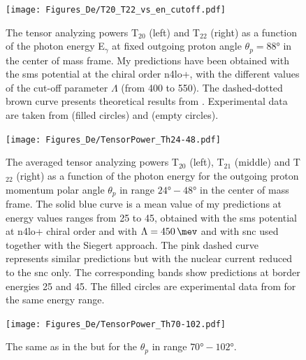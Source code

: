     \begin{figure}[h]
        \begin{center}
        \texttt{[image: Figures\_De/T20\_T22\_vs\_en\_cutoff.pdf]}
        \end{center}
        \caption{
        The tensor analyzing powers T$_{20}$ (left) and T$_{22}$ (right) as
        a function of the photon energy E$_\gamma$
        at fixed outgoing proton angle $\theta_p = \ang{88}$ in the center of mass frame.
        My predictions have been obtained with the \gls{sms} potential at the chiral order \gls{n4lo+},
        with the different values of the cut-off parameter $\Lambda$ (from \SI{400}{\mev} to \SI{550}{\mev}).
        The dashed-dotted brown curve presents theoretical results from \cite{Schmitt1989}.
        Experimental data are taken from \cite{rachek2007} (filled circles)
        and \cite{mishev1993} (empty circles).}
        \label{T20_vs_en_cutoff}
    \end{figure}

    \begin{figure}[h]
        \begin{center}
        \texttt{[image: Figures\_De/TensorPower\_Th24-48.pdf]}
        \end{center}
        \caption{The averaged tensor analyzing powers T$_{20}$ (left),
        T$_{21}$ (middle) and T$_{22}$ (right) as a function of the
        photon energy for the outgoing proton momentum polar angle $\theta_p$
        in range $\ang{24} - \ang{48}$ in the center of mass frame.
        The solid blue curve is a mean value of my predictions at energy values ranges
        from 25 to \SI{45}{\mev}, obtained with
        the \gls{sms} potential at \gls{n4lo+} chiral order and with $\Lambda=\SI{450}{\mev}$
        and with \gls{snc} used together with the Siegert approach. 
        The pink dashed curve represents similar predictions but with
        the nuclear current reduced to the \gls{snc} only. 
        The corresponding bands show predictions at border energies 25 and \SI{45}{\mev}.
        The filled circles are experimental data
        from \cite{rachek2007} for the same energy range.}
        \label{tensor_energy_24-48}
    \end{figure}

    \begin{figure}[h]
        \begin{center}
        \texttt{[image: Figures\_De/TensorPower\_Th70-102.pdf]}
        \end{center}
        \caption{The same as in the  but
        for the $\theta_p$ in range $\ang{70} - \ang{102}$.}
        \label{tensor_energy_70-102}
    \end{figure}
    
